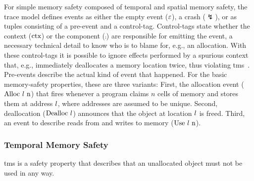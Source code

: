 \documentclass[dvipsnames,conference]{IEEEtran}
\theoremstyle{definition}
\begin{document}
For simple memory safety composed of temporal and spatial memory safety, the trace model defines events as either the empty event ($\varepsilon$), a crash ($\lightning$), or as tuples consisting of a pre-event and a control-tag.
Control-tags state whether the context ($\text{ctx}$) or the component ($\comp$) are responsible for emitting the event, a necessary technical detail to know who is to blame for, e.g., an allocation.
With these control-tags it is possible to ignore effects performed by a spurious context that, e.g., immediately deallocates a memory location twice, thus violating \gls*{tms}~\cite{nagarakatte2010cets}.
Pre-events describe the actual kind of event that happened.
For the basic memory-safety properties, these are three variants:
First, the allocation event ($\text{Alloc\ \ensuremath l\ n}$) that fires whenever a program claims $n$ cells of memory and stores them at address $l$, where addresses are assumed to be unique.
Second, deallocation ($\ev{Dealloc\ \loc}$) announces that the object at location $l$ is freed.
Third, an event to describe reads from and writes to memory ($\ev{Use\ \loc\ n}$).

\subsubsection{Temporal Memory Safety}

\gls*{tms} is a safety property that describes that an unallocated object must not be used in any way.
\end{document}
